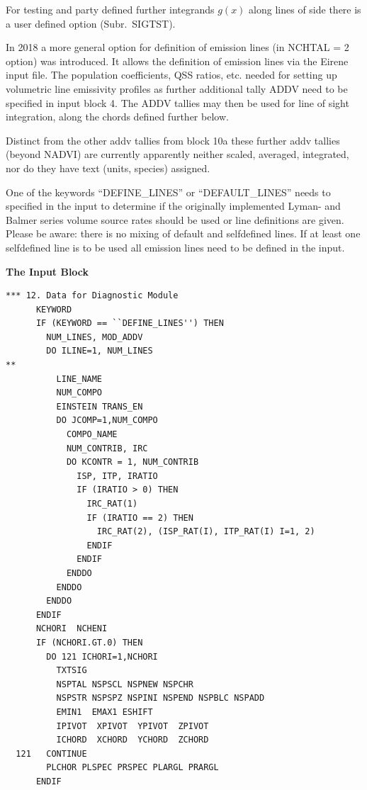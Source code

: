 For testing and  party defined further integrands $g(x)$ along
lines of side there is a user defined option (Subr.\ SIGTST).

In 2018 a more general option for definition of emission lines (in NCHTAL = 2
option) was introduced. It allows the definition of emission lines via the
Eirene input file. The population coefficients, QSS ratios, etc. needed for
setting up volumetric line emissivity profiles as further additional tally ADDV
need to be specified in input block 4. The ADDV tallies may then be used
for line of sight integration, along the chords defined further below.

Distinct from the other addv tallies from block 10a these
further addv tallies (beyond NADVI) are currently apparently neither
scaled, averaged, integrated, nor do they have text (units, species) assigned.

One of the keywords ``DEFINE\_LINES'' or ``DEFAULT\_LINES'' needs to specified
in the input to determine if the originally implemented Lyman- and
Balmer series volume source rates should be used or line definitions are
given. Please be aware: there is no mixing of default and
selfdefined lines. If at least one selfdefined line is to be used all
emission lines need to be defined in the input.



\medskip

\textbf{The Input Block}

\begin{lstlisting}
*** 12. Data for Diagnostic Module
      KEYWORD
      IF (KEYWORD == ``DEFINE_LINES'') THEN
        NUM_LINES, MOD_ADDV
        DO ILINE=1, NUM_LINES
**
          LINE_NAME
          NUM_COMPO
          EINSTEIN TRANS_EN
          DO JCOMP=1,NUM_COMPO
            COMPO_NAME
            NUM_CONTRIB, IRC
            DO KCONTR = 1, NUM_CONTRIB
              ISP, ITP, IRATIO
              IF (IRATIO > 0) THEN
                IRC_RAT(1)
                IF (IRATIO == 2) THEN
                  IRC_RAT(2), (ISP_RAT(I), ITP_RAT(I) I=1, 2)
                ENDIF
              ENDIF
            ENDDO
          ENDDO
        ENDDO
      ENDIF
      NCHORI  NCHENI
      IF (NCHORI.GT.0) THEN
        DO 121 ICHORI=1,NCHORI
          TXTSIG
          NSPTAL NSPSCL NSPNEW NSPCHR
          NSPSTR NSPSPZ NSPINI NSPEND NSPBLC NSPADD
          EMIN1  EMAX1 ESHIFT
          IPIVOT  XPIVOT  YPIVOT  ZPIVOT
          ICHORD  XCHORD  YCHORD  ZCHORD
  121   CONTINUE
        PLCHOR PLSPEC PRSPEC PLARGL PRARGL
      ENDIF
\end{lstlisting}

